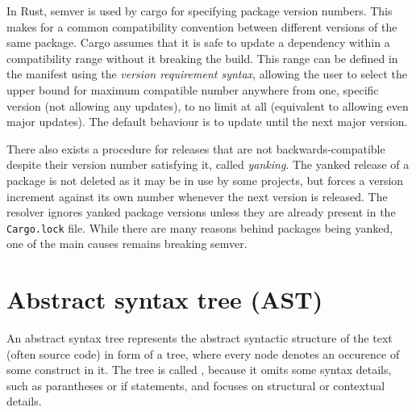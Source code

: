 \documentclass[licencjacka,en]{pracamgr}
\begin{document}
In Rust, semver is used by cargo for specifying package version numbers. This makes for a common
compatibility convention between different versions of the same package. Cargo assumes that
it is safe to update a dependency within a compatibility range without it breaking the build.
This range can be defined in the manifest using the \textit{version requirement syntax}, allowing
the user to select the upper bound for maximum compatible number anywhere from one, specific
version (not allowing any updates), to no limit at all (equivalent to allowing even major updates).
The default behaviour is to update until the next major version.


There also exists a procedure for releases that are not backwards-compatible despite their version
number satisfying it, called \textit{yanking}. The yanked release of a package is not
deleted as it may be in use by some projects, but forces a version increment against its own number
whenever the next version is released. The resolver ignores yanked package versions unless they are
already present in the \texttt{Cargo.lock} file. While there are many reasons behind packages being
yanked, one of the main causes remains breaking semver.

\section{Abstract syntax tree (AST)}

An abstract syntax tree represents the abstract syntactic structure of the text (often source code)
in form of a tree, where every node denotes an occurence of some construct in it. The tree is
called , because it omits some syntax details, such as parantheses or if statements,
and focuses on structural or contextual details.
\end{document}
